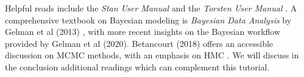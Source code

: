  Helpful reads include the \textit{Stan User Manual} \cite{author:0000} and the \textit{Torsten User Manual} \cite{author:0000}.
 A comprehensive textbook on Bayesian modeling is \textit{Bayesian Data Analysis} by Gelman et al (2013) \cite{Gelman:2013b}, with more recent insights on the Bayesian workflow provided by Gelman et al (2020). 
 Betancourt (2018) offers an accessible discussion on MCMC methods, with an emphasis on HMC \cite{Betancourt:2018}.
 We will discuss in the conclusion additional readings which can complement this tutorial.
  
 
 
 